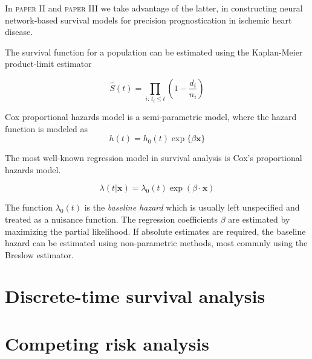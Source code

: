 In \textsc{paper II} and \textsc{paper III} we take advantage of the latter,
in constructing neural network-based survival models
for precision prognostication in ischemic heart disease.




The survival function for a population can be estimated using 
the Kaplan-Meier product-limit estimator


\begin{equation}
    \widehat{S} (t) = \prod_{i : \, t_i \leq t} \left(
        1 - \frac{d_i}{n_i}
    \right)
\end{equation}

Cox proportional hazards model is a semi-parametric model, 
where the hazard function is modeled as 
\begin{equation}
    h(t) = h_0(t) \exp \{\beta \mathbf{x}\}
\end{equation}


The most well-known regression model in survival analysis 
is Cox's proportional hazards model.

\begin{equation}
    \lambda (t | \mathbf{x}) = \lambda_0(t) \exp(\beta \cdot \mathbf{x})
\end{equation}

The function \(\lambda_0(t)\) is the \textit{baseline hazard} 
which is usually left unspecified and treated as a nuisance function.
The regression coefficients \(\beta\) are estimated
by maximizing the partial likelihood.
If absolute estimates are required, 
the baseline hazard can be estimated using non-parametric methods,
most commnly using the Breslow estimator.


\section{Discrete-time survival analysis}




\section{Competing risk analysis}




\autocite{biganzoliFeed1998}


